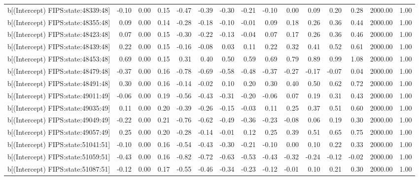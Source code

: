 \begin{table}[ht]
\begin{tabular}{rrrrrrrrrrrrrrr}
  b[(Intercept) FIPS:state:48339:48] & -0.10 & 0.00 & 0.15 & -0.47 & -0.39 & -0.30 & -0.21 & -0.10 & 0.00 & 0.09 & 0.20 & 0.28 & 2000.00 & 1.00 \\ 
  b[(Intercept) FIPS:state:48355:48] & 0.09 & 0.00 & 0.14 & -0.28 & -0.18 & -0.10 & -0.01 & 0.09 & 0.18 & 0.26 & 0.36 & 0.44 & 2000.00 & 1.00 \\ 
  b[(Intercept) FIPS:state:48423:48] & 0.07 & 0.00 & 0.15 & -0.30 & -0.22 & -0.13 & -0.04 & 0.07 & 0.17 & 0.26 & 0.36 & 0.46 & 2000.00 & 1.00 \\ 
  b[(Intercept) FIPS:state:48439:48] & 0.22 & 0.00 & 0.15 & -0.16 & -0.08 & 0.03 & 0.11 & 0.22 & 0.32 & 0.41 & 0.52 & 0.61 & 2000.00 & 1.00 \\ 
  b[(Intercept) FIPS:state:48453:48] & 0.69 & 0.00 & 0.15 & 0.31 & 0.40 & 0.50 & 0.59 & 0.69 & 0.79 & 0.89 & 0.99 & 1.08 & 2000.00 & 1.00 \\ 
  b[(Intercept) FIPS:state:48479:48] & -0.37 & 0.00 & 0.16 & -0.78 & -0.69 & -0.58 & -0.48 & -0.37 & -0.27 & -0.17 & -0.07 & 0.04 & 2000.00 & 1.00 \\ 
  b[(Intercept) FIPS:state:48491:48] & 0.30 & 0.00 & 0.16 & -0.14 & -0.02 & 0.10 & 0.20 & 0.30 & 0.40 & 0.50 & 0.62 & 0.72 & 2000.00 & 1.00 \\ 
  b[(Intercept) FIPS:state:49011:49] & -0.06 & 0.00 & 0.19 & -0.56 & -0.43 & -0.31 & -0.20 & -0.06 & 0.07 & 0.19 & 0.31 & 0.43 & 2000.00 & 1.00 \\ 
  b[(Intercept) FIPS:state:49035:49] & 0.11 & 0.00 & 0.20 & -0.39 & -0.26 & -0.15 & -0.03 & 0.11 & 0.25 & 0.37 & 0.51 & 0.60 & 2000.00 & 1.00 \\ 
  b[(Intercept) FIPS:state:49049:49] & -0.22 & 0.00 & 0.21 & -0.76 & -0.62 & -0.49 & -0.36 & -0.23 & -0.08 & 0.06 & 0.19 & 0.30 & 2000.00 & 1.00 \\ 
  b[(Intercept) FIPS:state:49057:49] & 0.25 & 0.00 & 0.20 & -0.28 & -0.14 & -0.01 & 0.12 & 0.25 & 0.39 & 0.51 & 0.65 & 0.75 & 2000.00 & 1.00 \\ 
  b[(Intercept) FIPS:state:51041:51] & -0.10 & 0.00 & 0.16 & -0.54 & -0.43 & -0.30 & -0.21 & -0.10 & 0.00 & 0.10 & 0.22 & 0.33 & 2000.00 & 1.00 \\ 
  b[(Intercept) FIPS:state:51059:51] & -0.43 & 0.00 & 0.16 & -0.82 & -0.72 & -0.63 & -0.53 & -0.43 & -0.32 & -0.24 & -0.12 & -0.02 & 2000.00 & 1.00 \\ 
  b[(Intercept) FIPS:state:51087:51] & -0.12 & 0.00 & 0.17 & -0.55 & -0.46 & -0.34 & -0.23 & -0.12 & -0.01 & 0.10 & 0.21 & 0.30 & 2000.00 & 1.00 \\ 

\end{tabular}
\end{table}
